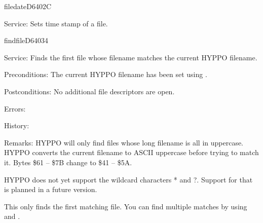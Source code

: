 \newpage
\begin{hyppotrap}{filedate}{D640}{2C}
\item [Service:]
  Sets time stamp of a file.
\notimplemented
\end{hyppotrap}


%
\newpage
\begin{hyppotrap}{findfile}{D640}{34}
\item [Service:]
  Finds the first file whose filename matches the current HYPPO filename.
\item [Preconditions:]
  The current HYPPO filename has been set using .
\item [Postconditions:]
  No additional file descriptors are open.
\item [Errors:]
\item [History:]
\item [Remarks:]
  HYPPO will only find files whose long filename is all in uppercase.
  HYPPO converts the current filename to ASCII uppercase before trying
  to match it. Bytes \$61 -- \$7B change to \$41 -- \$5A.

  HYPPO does not yet support the wildcard characters * and ?. Support
  for that is planned in a future version.

  This only finds the first matching file. You can find multiple matches by
  using  and .
\end{hyppotrap}


